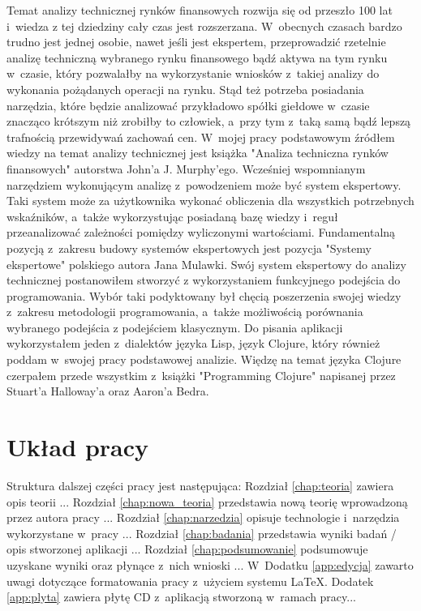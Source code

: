 Temat analizy technicznej rynków finansowych rozwija się od przeszło 100 lat i~wiedza z tej dziedziny cały czas jest rozszerzana. W~obecnych czasach bardzo trudno jest jednej osobie, nawet jeśli jest ekspertem, przeprowadzić rzetelnie analizę techniczną wybranego rynku finansowego bądź aktywa na tym rynku w~czasie, który pozwalałby na wykorzystanie wniosków z~takiej analizy do wykonania pożądanych operacji na rynku. Stąd też potrzeba posiadania narzędzia, które będzie analizować przykładowo spółki giełdowe w~czasie znacząco krótszym niż zrobiłby to człowiek, a~przy tym z~taką samą bądź lepszą trafnością przewidywań zachowań cen. W~mojej pracy podstawowym źródłem wiedzy na temat analizy technicznej jest książka "Analiza techniczna rynków finansowych"\cite{analiza} autorstwa John'a J. Murphy'ego. Wcześniej wspomnianym narzędziem wykonującym analizę z~powodzeniem może być system ekspertowy. Taki system może za użytkownika wykonać obliczenia dla wszystkich potrzebnych wskaźników, a~także wykorzystując posiadaną bazę wiedzy i~reguł przeanalizować zależności pomiędzy wyliczonymi wartościami. Fundamentalną pozycją z~zakresu budowy systemów ekspertowych jest pozycja "Systemy ekspertowe"\cite{mulawka} polskiego autora Jana Mulawki. Swój system ekspertowy do analizy technicznej postanowiłem stworzyć z wykorzystaniem funkcyjnego podejścia do programowania. Wybór taki podyktowany był chęcią poszerzenia swojej wiedzy z~zakresu metodologii programowania, a~także możliwością porównania wybranego podejścia z podejściem klasycznym. Do pisania aplikacji wykorzystałem jeden z~dialektów języka Lisp, język Clojure, który również poddam w~swojej pracy podstawowej analizie. Więdzę na temat języka Clojure czerpałem przede wszystkim z~książki "Programming Clojure" \cite{clojure} napisanej przez Stuart'a Halloway'a oraz Aaron'a Bedra.

\section{Układ pracy}

Struktura dalszej części pracy jest następująca: Rozdział \ref{chap:teoria} zawiera opis teorii ... Rozdział \ref{chap:nowa_teoria} przedstawia nową teorię wprowadzoną przez autora pracy ... Rozdział \ref{chap:narzedzia} opisuje technologie i~narzędzia wykorzystane w~pracy ...  Rozdział \ref{chap:badania} przedstawia wyniki badań / opis stworzonej aplikacji ... Rozdział \ref{chap:podsumowanie} podsumowuje uzyskane wyniki oraz płynące z~nich wnioski ... W~Dodatku \ref{app:edycja} zawarto uwagi dotyczące formatowania pracy z~użyciem systemu \LaTeX. Dodatek \ref{app:plyta} zawiera płytę CD z~aplikacją stworzoną w~ramach pracy...